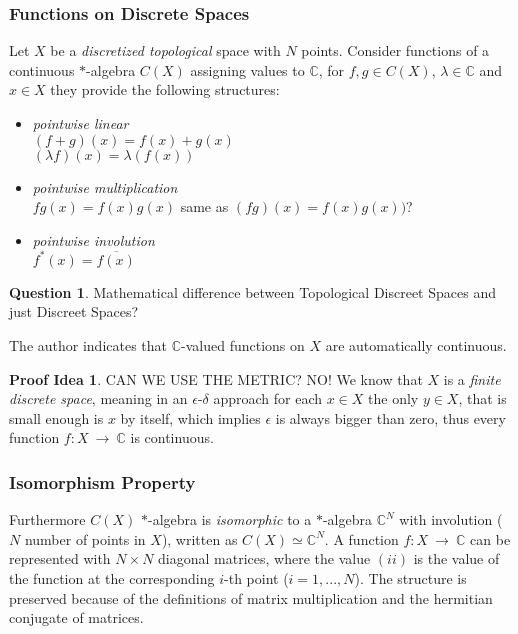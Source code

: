 \documentclass[a4paper]{article}
\theoremstyle{definition}
\theoremstyle{definition}
\newtheorem{question}{Question}
\theoremstyle{definition}
\theoremstyle{theorem}
\theoremstyle{theorem}
\newtheorem*{idea}{Proof Idea}
\begin{document}
\subsubsection{Functions on Discrete Spaces}
Let $X$ be a \textit{discretized topological} space with $N$ points.
Consider functions of a continuous $*$-algebra $C(X)$ assigning values to $\mathbb{C}$, for $f, g \in C(X)$,
$\lambda \in \mathbb{C}$ and $x \in X$ they provide the following structures:

\begin{itemize}
    \item \textit{pointwise linear} \\
      $(f + g)(x) = f(x) + g(x)$\\
      $(\lambda f)(x) = \lambda (f(x))$
    \item \textit{pointwise multiplication} \\
        $fg(x) = f(x)g(x)$ \hspace{0.1\textwidth} same as $(fg)(x) = f(x)g(x))$?
    \item \textit{pointwise involution} \\
        $f^*(x) = \overline{f(x)}$
\end{itemize}

\begin{question}
    Mathematical difference between Topological Discreet Spaces and just Discreet Spaces?
\end{question}

The author indicates that $\mathbb{C}$-valued functions on $X$ are automatically continuous.
\begin{idea}
    CAN WE USE THE METRIC? NO!
    We know that $X$ is a \textit{finite discrete space}, meaning in an $\epsilon$-$\delta$ approach
    for each $x \in X$ the only $y \in X$, that is small enough is $x$ by itself, which implies
    $\epsilon$ is always bigger than zero, thus every function $f:X\ \rightarrow\ \mathbb{C}$ is continuous.
\end{idea}

\subsubsection{Isomorphism Property}
Furthermore $C(X)$ $*$-algebra is \textit{isomorphic} to a $*$-algebra $\mathbb{C}^N$ with involution
($N$ number of points in $X$), written as $C(X) \simeq \mathbb{C}^N$.
A function $f:X\ \rightarrow\ \mathbb{C}$ can be represented with $N \times N$ diagonal matrices,
where the value $(ii)$ is the value of the function at the corresponding
$i$-th point ($i = 1,...,N$). The structure is preserved because of the definitions of
matrix multiplication and the hermitian conjugate of matrices.
\end{document}
